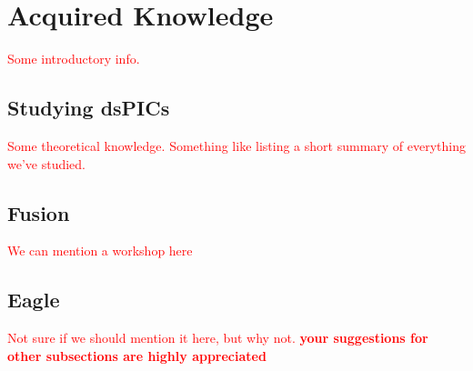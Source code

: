 \section{Acquired Knowledge} %

\textcolor{red}{Some introductory info.}

\subsection{Studying dsPICs}

\textcolor{red}{Some theoretical knowledge.
Something like listing a short summary of everything we've studied. }

\subsection{Fusion}

\textcolor{red}{We can mention a workshop here}

\subsection{Eagle}

\textcolor{red}{Not sure if we should mention it here, but why not.
\linebreak
\textbf{your suggestions for other subsections are highly appreciated}}
